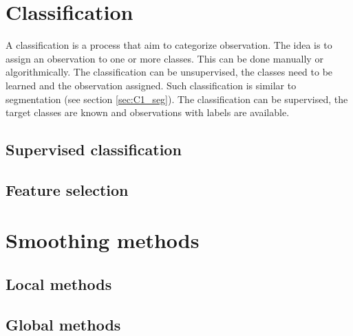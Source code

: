 \section{Classification}
A classification is a process that aim to categorize observation. The idea is to assign an observation to one or more classes. This can be done manually or algorithmically. The classification can be unsupervised, the classes need to be learned and the observation assigned. Such classification is similar to segmentation (see section \ref{sec:C1_seg}). The classification can be supervised, the target classes are known and observations with labels are available.

\subsection{Supervised classification}

\subsection{Feature selection}


\section{Smoothing methods}

\subsection{Local methods}

\subsection{Global methods}
\stopcontents[chapters]

